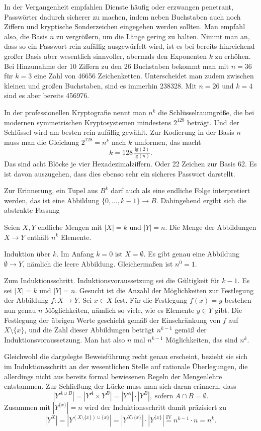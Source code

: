 In der Vergangenheit empfahlen Dienste häufig oder erzwangen penetrant,
Passwörter dadurch sicherer zu machen, indem neben Buchstaben auch noch
Ziffern und kryptische Sonderzeichen eingegeben werden sollten. Man
empfahl also, die Basis $n$ zu vergrößern, um die Länge gering zu halten.
Nimmt man an, dass so ein Passwort rein zufällig ausgewürfelt wird, ist
es bei bereits hinreichend großer Basis aber wesentlich sinnvoller,
abermals den Exponenten $k$ zu erhöhen. Bei Hinzunahme der 10 Ziffern zu
den 26 Buchstaben bekommt man mit $n=36$ für $k=3$ eine Zahl von 46656
Zeichenketten. Unterscheidet man zudem zwischen kleinen und großen
Buchstaben, sind es immerhin 238328. Mit $n=26$ und $k=4$ sind es aber
bereits 456976.

In der professionellen Kryptografie nennt man $n^k$ die
Schlüsselraumgröße, die bei modernen symmetrischen Kryptosystemen
mindestens $2^{128}$ beträgt. Und der Schlüssel wird am besten rein
zufällig gewählt. Zur Kodierung in der Basis $n$ muss man die Gleichung
$2^{128} = n^k$ nach $k$ umformen, das macht
\[k = 128\,\tfrac{\mathrm{lg}(2)}{\mathrm{lg}(n)}.\]
Das sind acht Blöcke je vier Hexadezimalziffern. Oder 22 Zeichen
zur Basis 62. Es ist davon auszugehen, dass dies ebenso sehr ein sicheres
Passwort darstellt.

Zur Erinnerung, ein Tupel aus $B^k$ darf auch als eine endliche Folge
interpretiert werden, das ist eine Abbildung
$\{0,\ldots,k-1\}\to B.$
Dahingehend ergibt sich die abstrakte Fassung

\begin{Satz}\newlinefirst
Seien $X,Y$ endliche Mengen mit $|X| = k$ und $|Y|=n$. Die Menge
der Abbildungen $X\to Y$ enthält $n^k$ Elemente.
\end{Satz}
\begin{Beweis}
Induktion über $k$. Im Anfang $k=0$ ist $X=\emptyset$. Es gibt genau
eine Abbildung $\emptyset\to Y$, nämlich die leere Abbildung.
Gleichermaßen ist $n^0=1$.

Zum Induktionsschritt. Induktionsvoraussetzung sei die Gültigkeit
für $k-1$. Es  sei $|X|=k$ und $|Y|=n$. Gesucht ist die Anzahl
der Möglichkeiten zur Festlegung der Abbildung $f\colon X\to Y$.
Sei $x\in X$ fest. Für die Festlegung $f(x)=y$ bestehen nun genau $n$
Möglichkeiten, nämlich so viele, wie es Elemente $y\in Y$ gibt.
Die Festlegung der übrigen Werte geschieht gemäß der Einschränkung
von $f$ auf $X\setminus\{x\}$, und die Zahl dieser Abbildungen beträgt
$n^{k-1}$ gemäß der Induktionsvoraussetzung. Man hat also $n$ mal
$n^{k-1}$ Möglichkeiten, das sind $n^k$.\,\qedsymbol
\end{Beweis}
Gleichwohl die dargelegte Beweisführung recht genau erscheint,
bezieht sie sich im Induktionsschritt an der wesentlichen Stelle
auf rationale Überlegungen, die allerdings nicht aus bereits
formal bewiesenen Regeln der Mengenlehre entstammen. Zur Schließung der
Lücke muss man sich daran erinnern, dass
\[|Y^{A\cup B}| = |Y^A\times Y^B| = |Y^A|\cdot |Y^B|,\;
\text{sofern}\; A\cap B=\emptyset.\]
Zusammen mit $|Y^{\{x\}}|=n$ wird der Induktionsschritt damit präzisiert zu
\[|Y^X| = |Y^{(X\setminus\{x\})\cup\{x\}}| = |Y^{X\setminus\{x\}}|\cdot |Y^{\{x\}}|
\stackrel{\mathrm{IV}}= n^{k-1}\cdot n = n^k.\]

